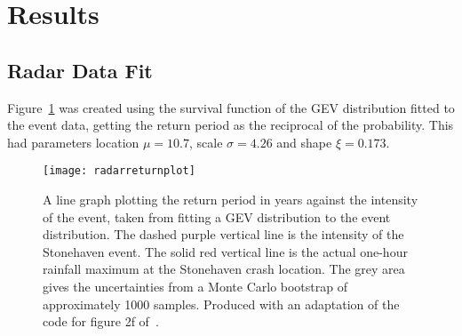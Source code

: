 \section{Results}\label{sec:results}

\begin{comment}
This section should detail the obtained results in a clear,
easy-to-follow manner. It is important to make clear what are original
results and what are repeats of previous calculations or computations.
Remember that long tables of numbers are just as boring to read as
they are to type-in!

Use graphs to present your results wherever practicable.

Results or computations should be presented with uncertainties
(errors), both statistical and systematic where applicable.

Be selective in what you include: half a dozen \emph{e.g.}~tables that
contain wrong data you collected while you forgot to switch on the
computer are not relevant and may mask the correct results.
\end{comment}

\subsection{Radar Data Fit}\label{subsec:radardatafit}

Figure~\ref{fig:radarreturnplot} was created using the survival function of the GEV distribution fitted to the event data,
    getting the return period as the reciprocal of the probability.
This had parameters location $\mu = 10.7$, scale $\sigma = 4.26$ and shape $\xi = 0.173$.

\begin{figure}[H]
    \centering
    \texttt{[image: radarreturnplot]}
    \caption[A line graph plotting the return period in years against the intensity of the event.]{
        A line graph plotting the return period in years against the intensity of the event,
        taken from fitting a GEV distribution to the event distribution.
    The dashed purple vertical line is the intensity of the Stonehaven event.
    The solid red vertical line is the actual one-hour rainfall maximum at the Stonehaven crash location.
    The grey area gives the uncertainties from a Monte Carlo bootstrap of approximately 1000 samples.
    Produced with an adaptation of the code for figure 2f of~\cite{Tett_Soon}.}
    \label{fig:radarreturnplot}
\end{figure}

